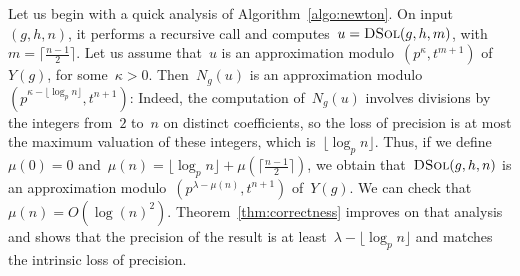 \documentclass{sig-alternate}
\theoremstyle{definition}
\theoremstyle{remark}
\newcommand\cO{\mathcal{O}}
\newcommand\Opt{\cO_K \llbracket t \rrbracket}
\def\geq{\geqslant}
\begin{document}


Let us begin with a quick analysis of Algorithm~\ref{algo:newton}.
On input~$(g,h,n)$, it performs a recursive call and
computes~$u = \textsc{DSol}(g, h, m)$, with~$m=\lceil \frac{n-1}{2} \rceil$.
Let us assume that~$u$ is an approximation modulo~$(p^\kappa, t^{m+1})$
of~$Y(g)$, for some~$\kappa > 0$.  Then~$N_g(u)$ is an approximation
modulo~$(p^{\kappa - \lfloor \log_p n \rfloor}, t^{n+1})$: Indeed, the
computation of~$N_g(u)$ involves divisions by the integers from~$2$ to~$n$ on distinct coefficients, so
the loss of precision is at most the maximum valuation of these integers, which
is~$\lfloor \log_p n \rfloor$.
Thus, if we define~$\mu(0)=0$ and~$\mu(n) = \lfloor \log_p n \rfloor + \mu(\lceil \frac{n-1}{2} \rceil)$,
we obtain that~$\textsc{DSol}(g, h, n)$ is an approximation modulo~$(p^{\lambda - \mu(n)}, t^{n+1})$
of~$Y(g)$.
We can check that~$\mu(n) = O(\log(n)^2)$.
Theorem~\ref{thm:correctness} improves on that analysis and shows that the precision of the result is at least~$\lambda - \lfloor \log_p n \rfloor$ and matches the intrinsic loss of precision.
\end{document}
